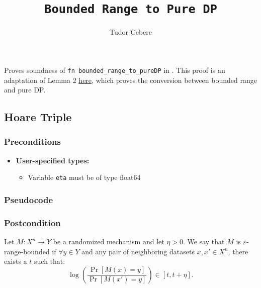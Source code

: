 \documentclass{article}
\title{\texttt{Bounded Range to Pure DP}}
\author{Tudor Cebere}
\begin{document}
\maketitle

\contrib
Proves soundness of \texttt{fn bounded\_range\_to\_pureDP} in .
This proof is an adaptation of Lemma 2 \href{https://differentialprivacy.org/exponential-mechanism-bounded-range/}{here}, which proves the conversion between bounded range \cite{durfee2019practical} and pure DP.

\subsection{Hoare Triple}
\subsubsection*{Preconditions}
\begin{itemize}
    \item \textbf{User-specified types:}
    \begin{itemize}
        \item Variable \texttt{eta} must be of type float64
    \end{itemize}
\end{itemize}

\subsubsection*{Pseudocode}



\subsubsection*{Postcondition}

\begin{definition}
\label{def:br}
    Let $M : X^n \to Y$ be a randomized mechanism and let $\eta > 0$. 
    We say that $M$ is $\varepsilon$-range-bounded if $\forall y \in Y$ 
    and any pair of neighboring datasets $x, x' \in X^n$, there exists a $t$ such that:
    \begin{equation}
        \log \left( \frac{\Pr[M(x) = y]}{\Pr[M(x') = y]} \right) \in \left[t, t + \eta \right].
    \end{equation}
\end{definition}
\end{document}
